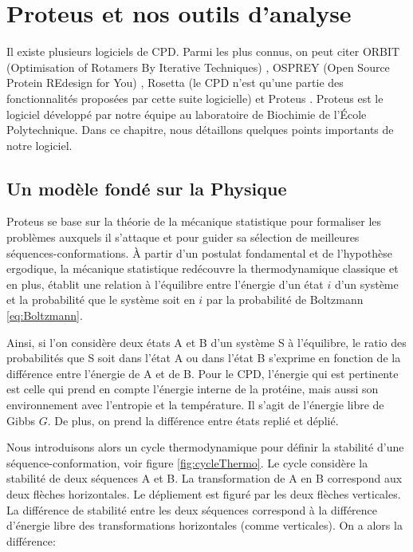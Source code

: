 \chapter{Proteus et nos outils d'analyse}
\label{chap:methodes}

Il existe plusieurs logiciels de CPD. Parmi les plus connus, on peut citer ORBIT (Optimisation of Rotamers By Iterative Techniques) \cite{Dahiyat96}, OSPREY (Open Source Protein REdesign for You) \cite{Gainza13}, Rosetta (le CPD n'est qu'une partie des fonctionnalités proposées par cette suite logicielle) \cite{Kuhlman03} et Proteus \cite{Simonson13,Polydorides16}. Proteus est le logiciel développé par notre équipe au laboratoire de Biochimie de l'École Polytechnique. Dans ce chapitre, nous détaillons quelques points importants de notre logiciel.  

\section{Un modèle fondé sur la Physique}
\label{sec:Phy}
Proteus se base sur la théorie de la mécanique statistique pour formaliser les problèmes auxquels il s'attaque et pour guider sa sélection de meilleures séquences-conformations. À partir d'un postulat fondamental et de l'hypothèse ergodique, la mécanique statistique \og redécouvre \fg la thermodynamique classique et en plus, établit une relation à l'équilibre entre l'énergie d'un état $i$ d'un système et la probabilité que le système soit en $i$ par la probabilité de Boltzmann \ref{eq:Boltzmann}.

Ainsi, si l'on considère deux états A et B d'un système S à l'équilibre, le ratio des probabilités que S soit dans l'état A ou dans l'état B s'exprime en fonction de la différence entre l'énergie de A et de B. Pour le CPD, l'énergie qui est pertinente est celle qui prend en compte l'énergie interne de la protéine, mais aussi son environnement avec l'entropie et la température. Il s'agit de l'énergie libre de Gibbs $G$. De plus, on prend la différence entre états replié et déplié.

Nous introduisons alors un cycle thermodynamique pour définir la stabilité d'une séquence-conformation, voir figure \ref{fig:cycleThermo}. Le cycle considère la stabilité de deux séquences A et B. La transformation de A en B correspond aux deux flèches horizontales. Le dépliement est figuré par les deux flèches verticales. La différence de stabilité entre les deux séquences correspond à la différence d'énergie libre des transformations horizontales (comme verticales). On a alors la différence: 

